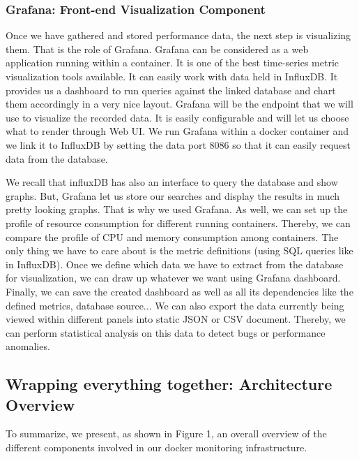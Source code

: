 \subsubsection{Grafana: Front-end Visualization Component}
Once we have gathered and stored performance data, the next step is visualizing them. That is the role of Grafana. Grafana can be considered as a web application running within a container. It is one of the best time-series metric visualization tools available. It can easily work with data held in InfluxDB. It provides us a dashboard to run queries against the linked database and chart them accordingly in a very nice layout. Grafana will be the endpoint that we will use to visualize the recorded data. It is easily configurable and will let us choose what to render through Web UI. We run Grafana within a docker container and we link it to InfluxDB by setting the data port 8086 so that it can easily request data from the database.

We recall that influxDB has also an interface to query the database and show graphs. But, Grafana let us store our searches and display the results in much pretty looking graphs. That is why we used Grafana.
As well, we can set up the profile of resource consumption for different running
containers. Thereby, we can compare the profile of CPU and memory consumption among containers. The only thing we have to care about is the metric definitions (using SQL queries like in InfluxDB). Once we define which data we have to extract from the database for visualization, we can draw up whatever we want using Grafana dashboard. Finally, we can save the created dashboard as well as all its dependencies like the defined metrics, database source... We can also export the data currently being viewed within different
panels into static JSON or CSV document. Thereby, we can perform statistical analysis on this data to detect bugs or performance anomalies.

\subsection{Wrapping everything together: Architecture Overview}
To summarize, we present, as shown in Figure 1, an overall overview of the different components involved in our docker monitoring infrastructure.

